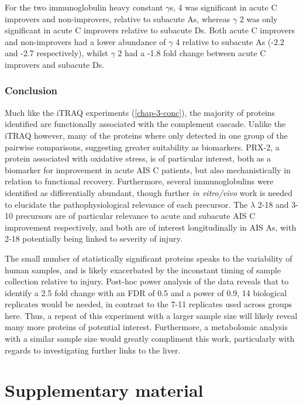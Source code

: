 \documentclass[9pt,lineno]{elife}
\begin{document}
For the two immunoglobulin heavy constant \(\gamma\)s, 4 was significant in acute C improvers and non-improvers, relative to subacute As, whereas \(\gamma\) 2 was only significant in acute C improvers relative to subacute Ds.
Both acute C improvers and non-improvers had a lower abundance of \(\gamma\) 4 relative to subacute As (-2.2 and -2.7 respectively), whilst \(\gamma\) 2 had a -1.8 fold change between acute C improvers and subacute Ds.

\hypertarget{chap4-conc}{%
\subsubsection{Conclusion}\label{chap4-conc}}

Much like the iTRAQ experiments (\ref{chap-3-conc}), the majority of proteins identified are functionally associated with the complement cascade.
Unlike the iTRAQ however, many of the proteins where only detected in one group of the pairwise comparisons, suggesting greater suitability as biomarkers.
PRX-2, a protein associated with oxidative stress, is of particular interest, both as a biomarker for improvement in acute AIS C patients, but also mechanistically in relation to functional recovery.
Furthermore, several immunoglobulins were identified as differentially abundant, though further \emph{in vitro/vivo} work is needed to elucidate the pathophysiological relevance of each precursor.
The \(\lambda\) 2-18 and 3-10 precursors are of particular relevance to acute and subacute AIS C improvement respectively, and both are of interest longitudinally in AIS As, with 2-18 potentially being linked to severity of injury.

The small number of statistically significant proteins speaks to the variability of human samples, and is likely exacerbated by the inconstant timing of sample collection relative to injury.
Post-hoc power analysis of the data reveals that to identify a 2.5 fold change with an FDR of 0.5 and a power of 0.9, 14 biological replicates would be needed, in contrast to the 7-11 replicates used across groups here.
Thus, a repeat of this experiment with a larger sample size will likely reveal many more proteins of potential interest.
Furthermore, a metabolomic analysis with a similar sample size would greatly compliment this work, particularly with regards to investigating further links to the liver.

\newpage

\hypertarget{sup-data}{%
\section*{Supplementary material}\label{sup-data}}
\end{document}
